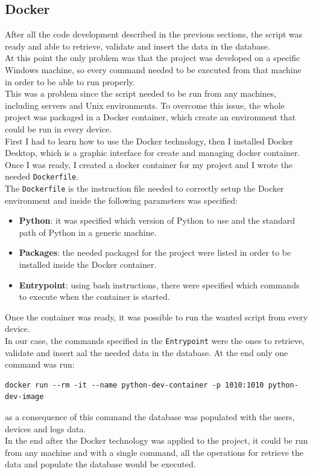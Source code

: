 \documentclass[12pt, a4paper, oneside]{article}
\begin{document}
\subsection{Docker}
After all the code development described in the previous sections, the script was ready and able to retrieve, validate and insert the data in the database.\\
At this point the only problem was that the project was developed on a specific Windows machine, so every command needed to be executed from that machine in order to be able to run properly.\\
This was a problem since the script needed to be run from any machines, including servers and Unix environments. To overcome this issue, the whole project was packaged in a Docker container, which
create an environment that could be run in every device.\\
First I had to learn how to use the Docker technology, then I installed Docker Desktop, which is a graphic interface for create and managing docker container. Once I was ready, I created a docker container for
my project and I wrote the needed \texttt{Dockerfile}. \\
The \texttt{Dockerfile} is the instruction file needed to correctly setup the Docker environment and inside the following parameters was specified:
\begin{itemize}
    \item \textbf{Python}: it was specified which version of Python to use and the standard path of Python in a generic machine.
    \item \textbf{Packages}: the needed packaged for the project were listed in order to be installed inside the Docker container.
    \item \textbf{Entrypoint}: using bash instructions, there were specified which commands to execute when the container is started.
\end{itemize}
Once the container was ready, it was possible to run the wanted script from every device.\\
In our case, the commands specified in the \texttt{Entrypoint} were the ones to retrieve, validate and insert aal the needed data in the database. At the end only one command was run:
\begin{center}
\scriptsize
\begin{BVerbatim}
docker run --rm -it --name python-dev-container -p 1010:1010 python-dev-image  
\end{BVerbatim}
\end{center}
as a consequence of this command the database was populated with the users, devices and logs data.\\
In the end after the Docker technology was applied to the project, it could be run from any machine and with a single command, all the operations for retrieve the data and populate the database would be executed. 
\end{document}
